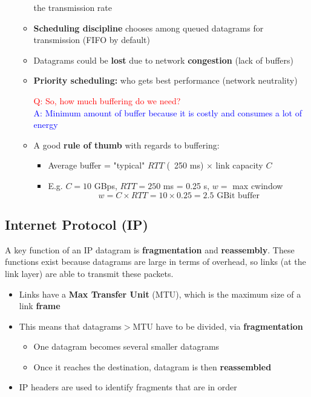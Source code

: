 \documentclass{article}
\begin{document}
\begin{itemize}
\begin{itemize}
        the transmission rate
        \item \textbf{Scheduling discipline} chooses among queued datagrams for transmission (FIFO by default)
        \item Datagrams could be \textbf{lost} due to network \textbf{congestion} (lack of buffers)
        \item \textbf{Priority scheduling:} who gets best performance (network neutrality)
        \begin{center}
            \textcolor{red}{Q: So, how much buffering do we need?} \\
            \textcolor{blue}{A: Minimum amount of buffer because it is costly and consumes a lot of energy}
        \end{center}
        \item A good \textbf{rule of thumb} with regards to buffering:
        \begin{itemize}
            \item Average buffer = "typical" $RTT$ (~250 ms) $\times$ link capacity $C$
            \item E.g. $C=10$ GBps, $RTT=250$ ms = 0.25 s, $w=$ max cwindow
            \[w=C\times RTT=10\times0.25=2.5 \text{ GBit buffer}\]
        \end{itemize}
    \end{itemize}
\end{itemize}
\newpage

\subsection{Internet Protocol (IP)}
A key function of an IP datagram is \textbf{fragmentation} and \textbf{reassembly}. These functions
exist because datagrams are large in terms of overhead, so links (at the link layer) are able to
transmit these packets.
\begin{itemize}
    \item Links have a \textbf{Max Transfer Unit} (MTU), which is the maximum size of a link \textbf{frame} 
    \item This means that datagrams$>$MTU have to be divided, via \textbf{fragmentation}
    \begin{itemize}
        \item One datagram becomes several smaller datagrams
        \item Once it reaches the destination, datagram is then \textbf{reassembled}
    \end{itemize}
    \item IP headers are used to identify fragments that are in order
\end{itemize}
\end{document}
